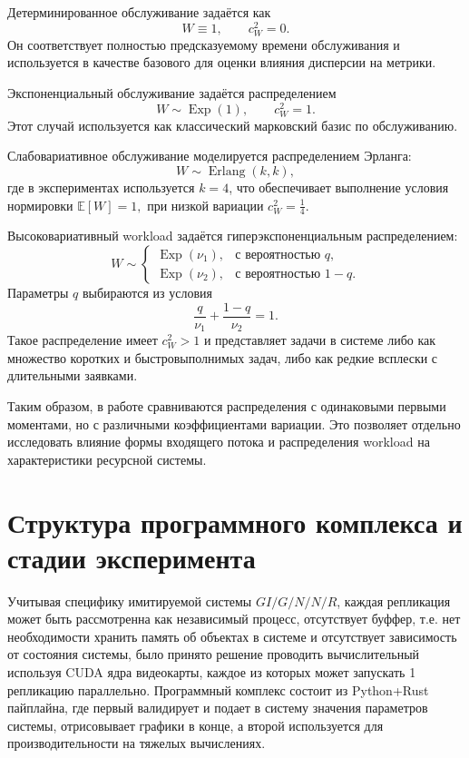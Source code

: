 Детерминированное обслуживание задаётся как
$$
W \equiv 1,
\qquad
c_W^2=0.
$$
Он соответствует полностью предсказуемому времени обслуживания и используется в качестве базового для оценки влияния дисперсии на метрики. 

Экспоненциальный обслуживание задаётся распределением
$$
W \sim \operatorname{Exp}(1),
\qquad
c_W^2=1.
$$
Этот случай используется как классический марковский базис по обслуживанию.

Слабовариативное обслуживание моделируется распределением Эрланга:
$$
W \sim \operatorname{Erlang}(k,k),
$$
где в экспериментах используется $k=4$, что обеспечивает выполнение условия нормировки $\mathbb{E}[W]=1,$ при низкой вариации $c_W^2=\frac{1}{4}.$

Высоковариативный workload задаётся гиперэкспоненциальным распределением:
$$
W \sim
\begin{cases}
\operatorname{Exp}(\nu_1), & \text{с вероятностью } q,\\
\operatorname{Exp}(\nu_2), & \text{с вероятностью } 1-q.
\end{cases}
$$
Параметры $q$ выбираются из условия
$$
\frac{q}{\nu_1}+\frac{1-q}{\nu_2}=1.
$$
Такое распределение имеет $c_W^2>1$ и представляет задачи в системе либо как множество коротких и быстровыполнимых задач, либо как редкие всплески  с длительными заявками.

Таким образом, в работе сравниваются распределения с одинаковыми первыми моментами, но с различными коэффициентами вариации. Это позволяет отдельно исследовать влияние формы входящего потока и распределения workload на характеристики ресурсной системы.

\section{Структура программного комплекса и стадии эксперимента}
\label{sec:software_architecture}

Учитывая специфику имитируемой системы $GI/G/N/N/R$, каждая репликация может быть рассмотренна как независимый процесс\cite{fishman1996_monte_carlo,law2015_simulation_modeling}, отсутствует буффер, т.е. нет необходимости хранить память об объектах в системе и отсутствует зависимость от состояния системы, было принято решение проводить вычислительный используя CUDA ядра видеокарты, каждое из которых может запускать 1 репликацию параллельно. Программный комплекс состоит из Python+Rust пайплайна, где первый валидирует и подает в систему значения параметров системы, отрисовывает графики в конце, а второй используется для производительности на тяжелых вычислениях.  

